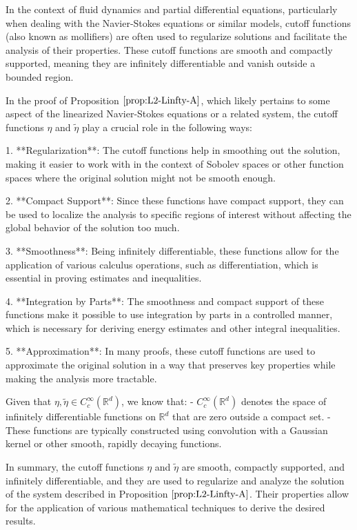 In the context of fluid dynamics and partial differential equations, particularly when dealing with the Navier-Stokes equations or similar models, cutoff functions (also known as mollifiers) are often used to regularize solutions and facilitate the analysis of their properties. These cutoff functions are smooth and compactly supported, meaning they are infinitely differentiable and vanish outside a bounded region.

In the proof of Proposition \(\ref{prop:L2-Linfty-A}\), which likely pertains to some aspect of the linearized Navier-Stokes equations or a related system, the cutoff functions \(\eta\) and \(\tilde{\eta}\) play a crucial role in the following ways:

1. **Regularization**: The cutoff functions help in smoothing out the solution, making it easier to work with in the context of Sobolev spaces or other function spaces where the original solution might not be smooth enough.

2. **Compact Support**: Since these functions have compact support, they can be used to localize the analysis to specific regions of interest without affecting the global behavior of the solution too much.

3. **Smoothness**: Being infinitely differentiable, these functions allow for the application of various calculus operations, such as differentiation, which is essential in proving estimates and inequalities.

4. **Integration by Parts**: The smoothness and compact support of these functions make it possible to use integration by parts in a controlled manner, which is necessary for deriving energy estimates and other integral inequalities.

5. **Approximation**: In many proofs, these cutoff functions are used to approximate the original solution in a way that preserves key properties while making the analysis more tractable.

Given that \(\eta, \tilde{\eta} \in C_c^\infty(\mathbb{R}^d)\), we know that:
- \(C_c^\infty(\mathbb{R}^d)\) denotes the space of infinitely differentiable functions on \(\mathbb{R}^d\) that are zero outside a compact set.
- These functions are typically constructed using convolution with a Gaussian kernel or other smooth, rapidly decaying functions.

In summary, the cutoff functions \(\eta\) and \(\tilde{\eta}\) are smooth, compactly supported, and infinitely differentiable, and they are used to regularize and analyze the solution of the system described in Proposition \(\ref{prop:L2-Linfty-A}\). Their properties allow for the application of various mathematical techniques to derive the desired results.